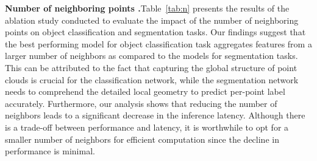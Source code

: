 \documentclass[preprint,12pt]{elsarticle}
\begin{document}
\begin{table}[t]
\caption{Component study of MKConv on S3DIS.}
\vspace{-0.3cm}
\begin{center}
	\label{tab:ablation_s3dis}
\end{center}
\end{table}
\medskip
\noindent\textbf{Number of neighboring points .}\hspace{0.3cm}Table~\ref{tab:n} presents the results of the ablation study conducted to evaluate the impact of the number of neighboring points  on object classification and segmentation tasks. Our findings suggest that the best performing model for object classification task aggregates features from a larger number of neighbors as compared to the models for segmentation tasks. This can be attributed to the fact that capturing the global structure of point clouds is crucial for the classification network, while the segmentation network needs to comprehend the detailed local geometry to predict per-point label accurately. Furthermore, our analysis shows that reducing the number of neighbors leads to a significant decrease in the inference latency. Although there is a trade-off between performance and latency, it is worthwhile to opt for a smaller number of neighbors for efficient computation since the decline in performance is minimal.
\end{document}
